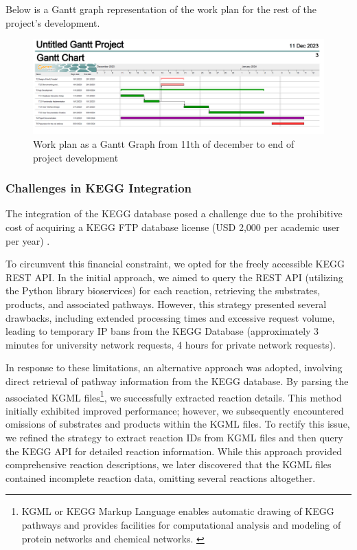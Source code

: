 \documentclass[12pt]{article}
\begin{document}
Below is a Gantt graph representation of the work plan for the rest of the project's development.
\begin{landscape}
    \begin{figure}[H]
        \centering
        \includegraphics[scale=0.4]{Gantt2.png}
        \caption{Work plan as a Gantt Graph from 11th of december to end of project development}
        \label{fig:Gant2}
    \end{figure}
\end{landscape}

\subsubsection{Challenges in KEGG Integration}

The integration of the KEGG database posed a challenge due to the prohibitive cost of acquiring a KEGG FTP database license (USD 2,000 per academic user per year) \cite{pricelicence}.

To circumvent this financial constraint, we opted for the freely accessible KEGG REST API. In the initial approach, we aimed to query the REST API (utilizing the Python library bioservices) for each reaction, retrieving the substrates, products, and associated pathways. However, this strategy presented several drawbacks, including extended processing times and excessive request volume, leading to temporary IP bans from the KEGG Database (approximately 3 minutes for university network requests, 4 hours for private network requests).


In response to these limitations, an alternative approach was adopted, involving direct retrieval of pathway information from the KEGG database. By parsing the associated KGML files\footnote{KGML or KEGG Markup Language enables automatic drawing of KEGG pathways and provides facilities for computational analysis and modeling of protein networks and chemical networks. \cite{KGMLDescription}}, we successfully extracted reaction details. This method initially exhibited improved performance; however, we subsequently encountered omissions of substrates and products within the KGML files. To rectify this issue, we refined the strategy to extract reaction IDs from KGML files and then query the KEGG API for detailed reaction information. While this approach provided comprehensive reaction descriptions, we later discovered that the KGML files contained incomplete reaction data, omitting several reactions altogether.
\end{document}
